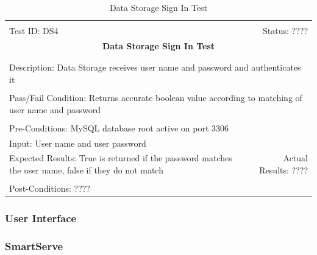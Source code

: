 \documentclass[11pt]{article}
\begin{document}
\begin{center}
\begin{table}[H]
\begin{tabular}{|l r|}\hline&\\[-2mm]
	Test ID: DS4	&Status: ????\\[-3mm]
	\multicolumn{2}{|c|}{\textbf{\large{Data Storage Sign In Test}}}\\&\\\hline&\\[-3mm]
	\multicolumn{2}{|p{\textwidth}|}{Description: Data Storage receives user name and password and authenticates it}\\[1mm]\hline&\\[-3mm]
	\multicolumn{2}{|p{\textwidth}|}{Pass/Fail Condition: Returns accurate boolean value according to matching of user name and password}\\[1mm]\hline&\\[-3mm]
	\multicolumn{2}{|p{\textwidth}|}{Pre-Conditions: MySQL database root active on port 3306}\\[4mm]
	\multicolumn{2}{|p{\textwidth}|}{Input: User name and user password}\\[2mm]\hline
	\multicolumn{1}{|p{0.49\textwidth}}{Expected Results: True is returned if the password matches the user name, false if they do not match}	&\multicolumn{1}{|p{0.45\textwidth}|}{Actual Results: ????}\\\hline&\\[-3mm]
	\multicolumn{2}{|p{\textwidth}|}{Post-Conditions: ????}\\\hline
\end{tabular}
\caption{Data Storage Sign In Test}
\end{table}
\end{center}

\subsubsection{User Interface} %



\subsubsection{SmartServe}
\end{document}
